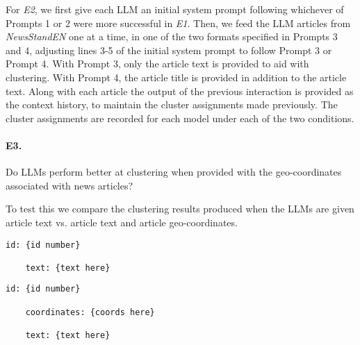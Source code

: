 For \emph{E2}, we first give each LLM an initial system prompt following whichever of Prompts 1 or 2 were more successful in \emph{E1}.
Then, we feed the LLM articles from \emph{NewsStandEN} one at a time, in one of the two formats specified in Prompts 3 and 4, adjusting lines 3-5 of the initial system prompt to follow Prompt 3 or Prompt 4. 
With Prompt 3, only the article text is provided to aid with clustering.
With Prompt 4, the article title is provided in addition to the article text.
Along with each article the output of the previous interaction is provided as the context history, to maintain the cluster assignments made previously.
The cluster assignments are recorded for each model under each of the two conditions.

    
    


\paragraph{\textbf{E3.}}
Do LLMs perform better at clustering when provided with the geo-coordinates associated with news articles? 

\noindent To test this we compare the clustering results produced when the LLMs are given article text vs. article text and article geo-coordinates. 

\begin{lstlisting}[title=Prompt 5: No Geo-coords Prompt]
    id: {id number}

    text: {text here}
\end{lstlisting}

\begin{lstlisting}[title=Prompt 6: Geo-coords Prompt]
    id: {id number}
    
    coordinates: {coords here}

    text: {text here}
    \end{lstlisting}
    



